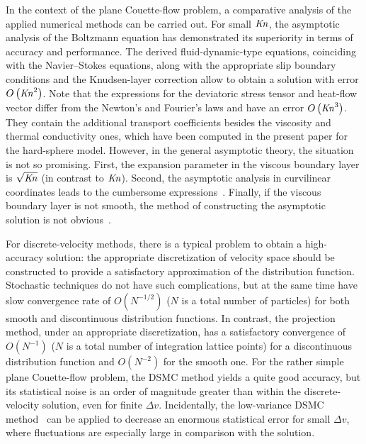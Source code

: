 \documentclass[final]{jfm} %
\newcommand{\Kn}{\mbox{\textit{Kn}}}
\newcommand{\OO}[1]{O\left(#1\right)}
\begin{document}
In the context of the plane Couette-flow problem,
a comparative analysis of the applied numerical methods can be carried out.
For small \(\Kn\), the asymptotic analysis of the Boltzmann equation has demonstrated
its superiority in terms of accuracy and performance.
The derived fluid-dynamic-type equations, coinciding with the Navier--Stokes equations,
along with the appropriate slip boundary conditions and the Knudsen-layer correction
allow to obtain a solution with error \(\OO{\Kn^2}\).
Note that the expressions for the deviatoric stress tensor and heat-flow vector
differ from the Newton's and Fourier's laws and have an error \(\OO{\Kn^3}\).
They contain the additional transport coefficients besides the viscosity and thermal conductivity ones,
which have been computed in the present paper for the hard-sphere model.
However, in the general asymptotic theory, the situation is not so promising.
First, the expansion parameter in the viscous boundary layer is \(\sqrt{\Kn}\) (in contrast to \(\Kn\)).
Second, the asymptotic analysis in curvilinear coordinates leads to the cumbersome expressions~\citep{Sone2002}.
Finally, if the viscous boundary layer is not smooth,
the method of constructing the asymptotic solution is not obvious~\citep{Aoki2014}.

For discrete-velocity methods, there is a typical problem to obtain a high-accuracy solution:
the appropriate discretization of velocity space should be constructed
to provide a satisfactory approximation of the distribution function.
Stochastic techniques do not have such complications,
but at the same time have slow convergence rate of \(\OO{N^{-1/2}}\)
(\(N\) is a total number of particles)
for both smooth and discontinuous distribution functions.
In contrast, the projection method, under an appropriate discretization,
has a satisfactory convergence of \(\OO{N^{-1}}\)
(\(N\) is a total number of integration lattice points)
for a discontinuous distribution function and \(\OO{N^{-2}}\) for the smooth one.
For the rather simple plane Couette-flow problem,
the DSMC method yields a quite good accuracy, but its statistical noise
is an order of magnitude greater than within the discrete-velocity solution, even for finite \(\Delta{v}\).
Incidentally, the low-variance DSMC method~\citep{Hadji2011}
can be applied to decrease an enormous statistical error for small \(\Delta{v}\),
where fluctuations are especially large in comparison with the solution.
\end{document}
